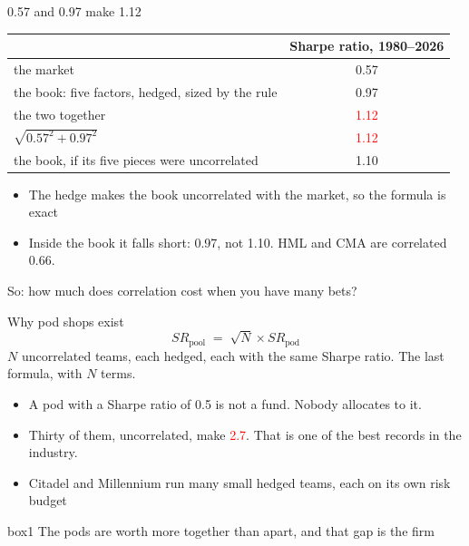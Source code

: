 \documentclass[aspectratio=169,10pt]{beamer}
\begin{document}
\begin{frame}{0.57 and 0.97 make 1.12}
\vskip 4pt
\begin{center}
\renewcommand{\arraystretch}{1.3}
\begin{tabular}{lc}
\toprule
 & Sharpe ratio, 1980--2026 \\
\midrule
the market & 0.57 \\
the book: five factors, hedged, sized by the rule & 0.97 \\
the two together & \textcolor{red}{1.12} \\
$\sqrt{0.57^{2} + 0.97^{2}}$ & \textcolor{red}{1.12} \\
\midrule
the book, if its five pieces were uncorrelated & 1.10 \\
\bottomrule
\end{tabular}
\end{center}
\vskip 8pt
\begin{itemize}
\item The hedge makes the book uncorrelated with the market, so the formula is exact
\vskip 6pt
\item Inside the book it falls short: 0.97, not 1.10. HML and CMA are correlated 0.66.
\end{itemize}
\vskip 6pt
\begin{center}
So: how much does correlation cost when you have many bets?
\end{center}
\end{frame}

\begin{frame}{Why pod shops exist}
\[ SR_{\text{pool}} \;=\; \sqrt{N}\times SR_{\text{pod}} \]
{\small $N$ uncorrelated teams, each hedged, each with the same Sharpe ratio. The last formula, with $N$ terms.}
\vskip 14pt
\begin{itemize}
\item A pod with a Sharpe ratio of 0.5 is not a fund. Nobody allocates to it.
\vskip 8pt
\item Thirty of them, uncorrelated, make \textcolor{red}{2.7}. That is one of the best records in the industry.
\vskip 8pt
\item Citadel and Millennium run many small hedged teams, each on its own risk budget
\end{itemize}
\vskip 14pt
\begin{beamercolorbox}[rounded=true,sep=7pt,center]{box1}
The pods are worth more together than apart, and that gap is the firm
\end{beamercolorbox}
\end{frame}
\end{document}
